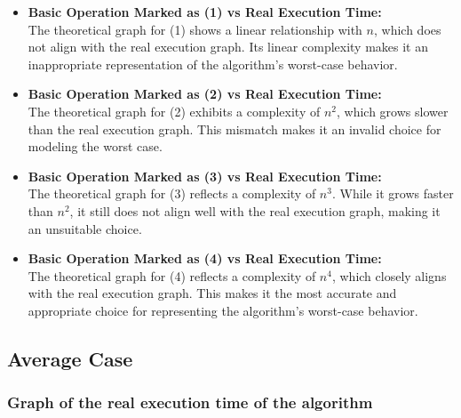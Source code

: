 \documentclass[11pt, oneside, a4paper]{article}
\begin{document}
\begin{itemize}
    \item \textbf{Basic Operation Marked as (1) vs Real Execution Time:} \\
    The theoretical graph for (1) shows a linear relationship with \(n\), which does not align with the real execution graph. Its linear complexity makes it an inappropriate representation of the algorithm’s worst-case behavior.

    \item \textbf{Basic Operation Marked as (2) vs Real Execution Time:} \\
    The theoretical graph for (2) exhibits a complexity of \(n^2\), which grows slower than the real execution graph. This mismatch makes it an invalid choice for modeling the worst case.

    \item \textbf{Basic Operation Marked as (3) vs Real Execution Time:} \\
    The theoretical graph for (3) reflects a complexity of \(n^3\). While it grows faster than \(n^2\), it still does not align well with the real execution graph, making it an unsuitable choice.

    \item \textbf{Basic Operation Marked as (4) vs Real Execution Time:} \\
    The theoretical graph for (4) reflects a complexity of \(n^4\), which closely aligns with the real execution graph. This makes it the most accurate and appropriate choice for representing the algorithm’s worst-case behavior.
\end{itemize}




	\subsection{Average Case}

\subsubsection{Graph of the real execution time of the algorithm}
\end{document}

